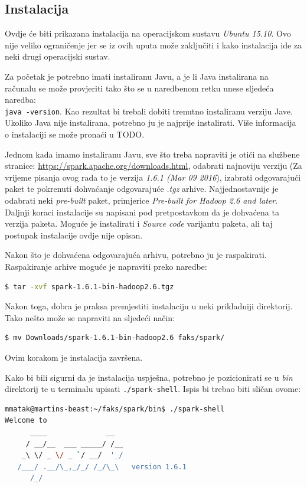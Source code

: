 \documentclass[times, utf8, zavrsni]{fer}
\begin{document}
\newpage
\begin{appendices}
\chapter{Instalacija}
\label{ch:instalacijaSpark}
Ovdje će biti prikazana instalacija na operacijskom sustavu \emph{Ubuntu 15.10}. Ovo nije veliko ograničenje jer se iz ovih uputa može zaključiti i kako instalacija ide za neki drugi operacijski sustav.

Za početak je potrebno imati instaliranu Javu, a je li Java instalirana na računalu se može provjeriti tako što se u naredbenom retku unese sljedeća naredba:\\
\texttt{java -version}. Kao rezultat bi trebali dobiti trenutno instaliranu verziju Jave. Ukoliko Java nije instalirana, potrebno ju je najprije instalirati. Više informacija o instalaciji se može pronaći u TODO.

Jednom kada imamo instaliranu Javu, sve što treba napraviti je otići na službene stranice: \url{https://spark.apache.org/downloads.html}, odabrati najnoviju verziju (Za vrijeme pisanja ovog rada to je verzija \emph{1.6.1 (Mar 09 2016}), izabrati odgovarajući paket te pokrenuti dohvaćanje odgovarajuće \emph{.tgz} arhive. Najjednostavnije je odabrati neki \emph{pre-built} paket, primjerice \emph{Pre-built for Hadoop 2.6 and later}. Daljnji koraci instalacije su napisani pod pretpostavkom da je dohvaćena ta verzija paketa. Moguće je instalirati i \emph{Source code} varijantu paketa, ali taj postupak instalacije ovdje nije opisan. 

Nakon što je dohvaćena odgovarajuća arhivu, potrebno ju je raspakirati.\\ Raspakiranje arhive moguće je napraviti preko naredbe:
\begin{lstlisting}[language=bash, size=tiny]
$ tar -xvf spark-1.6.1-bin-hadoop2.6.tgz
\end{lstlisting}
Nakon toga, dobra je praksa premjestiti instalaciju u neki prikladniji direktorij. Tako nešto može se napraviti na sljedeći način:
\begin{lstlisting}[language=bash, size=tiny]
$ mv Downloads/spark-1.6.1-bin-hadoop2.6 faks/spark/
\end{lstlisting}
Ovim korakom je instalacija završena. 

Kako bi bili sigurni da je instalacija uspješna, potrebno je pozicionirati se u \emph{bin} direktorij te u terminalu upisati \texttt{./spark-shell}. Ispis bi trebao biti sličan ovome:\\
\begin{lstlisting}[language=bash, size=tiny]
mmatak@martins-beast:~/faks/spark/bin$ ./spark-shell
Welcome to
      ____              __
     / __/__  ___ _____/ /__
    _\ \/ _ \/ _ `/ __/  '_/
   /___/ .__/\_,_/_/ /_/\_\   version 1.6.1
      /_/


\end{lstlisting}
\end{appendices}
\end{document}
